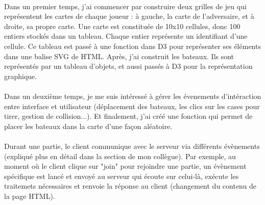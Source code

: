 \documentclass[a4paper, 11pt]{article}
\begin{document}
\paragraph{} Dans un premier temps, j'ai commencer par construire deux grilles de jeu qui représentent les cartes de chaque joueur : à
gauche, la carte de l'adversaire, et à droite, sa propre carte. Une carte est constituée de 10x10 cellules, donc 100 entiers stockés dans
un tableau. Chaque entier représente un identifiant d'une cellule. Ce tableau est passé à une fonction dans D3 pour représenter ses 
éléments dans une balise SVG de HTML. Après, j'ai construit les bateaux. Ils sont représentés par un tableau d'objets, et aussi 
passés à D3 pour la représentation graphique.
\paragraph{} Dans un deuxième temps, je me suis intéressé à gérer les évenements d'intéraction entre interface et utilisateur (déplacement
des bateaux, les clics sur les cases pour tirer, gestion de collision...). Et finalement, j'ai créé une fonction qui permet de placer les
bateaux dans la carte d'une façon aléatoire.
\paragraph{} Durant une partie, le client communique avec le serveur via différents évènements (expliqué plus en détail dans la section de mon collègue). Par exemple,
au moment où le client clique sur "join" pour rejoindre une partie, un évènement spécifique est lancé et envoyé au serveur qui écoute sur celui-là, exécute
les traitemets nécessaires et renvoie la réponse au client (changement du contenu de la page HTML).
\end{document}
